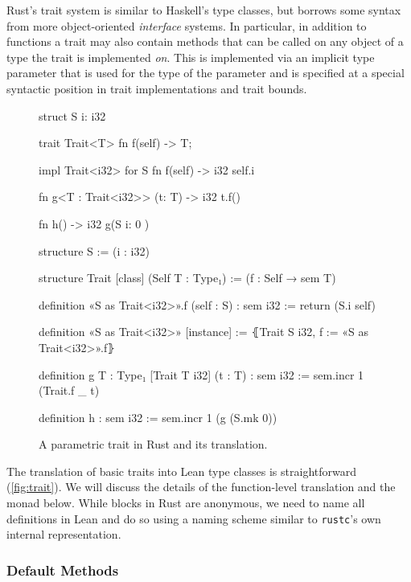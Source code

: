 Rust's trait system is similar to Haskell's type classes, but borrows some
syntax from more object-oriented \emph{interface} systems. In particular, in addition
to functions a trait may also contain methods that can be called on any object
of a type the trait is implemented \emph{on}. This is implemented via an implicit
type parameter  that is used for the type of the 
parameter and is specified at a special syntactic position in trait
implementations and trait bounds.

\begin{figure}[bt]
\begin{sbs1}
struct S { i: i32 }

trait Trait<T> {
  fn f(self) -> T;
}

impl Trait<i32> for S {
  fn f(self) -> i32 {
    self.i
  }
}

fn g<T : Trait<i32>>
  (t: T) -> i32 {
  t.f()
}

fn h() -> i32 {
  g(S { i: 0 })
}
\end{sbs1}
\begin{sbs2}
structure S := (i : i32)

structure Trait [class] (Self T : Type₁) :=
(f : Self → sem T)

definition «S as Trait<i32>».f (self : S) : sem i32 :=
return (S.i self)

definition «S as Trait<i32>» [instance] :=
⦃Trait S i32, f := «S as Trait<i32>».f⦄

definition g {T : Type₁} [Trait T i32] (t : T) : sem i32 :=
sem.incr 1 (Trait.f _ t)

definition h : sem i32 :=
sem.incr 1 (g (S.mk 0))
\end{sbs2}

\caption{A parametric trait in Rust and its translation.}
\label{fig:trait}
\end{figure}

The translation of basic traits into Lean type classes is straightforward
(\autoref{fig:trait}). We will discuss the details of the function-level translation and the 
monad below. While  blocks in Rust are anonymous, we need to name all
definitions in Lean and do so using a naming scheme similar to \texttt{rustc}'s
own internal representation.

\subsubsection{Default Methods}

